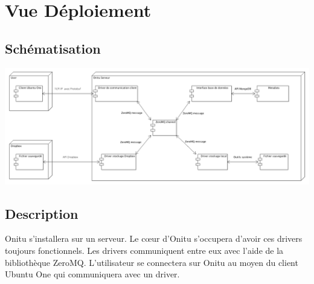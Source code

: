\chapter{Vue Déploiement}
\thispagestyle{EIP}

\section{Schématisation}
\includegraphics[scale= 0.3]{deployment.png} 

\section{Description}

Onitu s'installera sur un serveur. Le cœur d'Onitu s'occupera d'avoir ces drivers toujours fonctionnels. Les drivers communiquent entre eux avec l'aide de la bibliothèque ZeroMQ. L'utilisateur se connectera sur Onitu au moyen du client Ubuntu One qui communiquera avec un driver.
